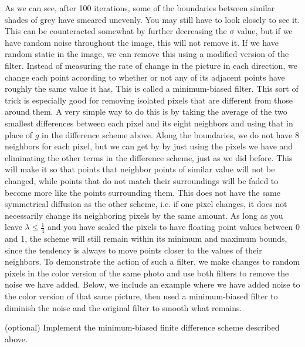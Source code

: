 As we can see, after 100 iterations, some of the boundaries between similar shades of grey have smeared unevenly. You may still have to look closely to see it.
This can be counteracted somewhat by further decreasing the $\sigma$ value, but if we have random noise throughout the image, this will not remove it.
If we have random static in the image, we can remove this using a modified version of the filter.
Instead of measuring the rate of change in the picture in each direction, we change each point according to whether or not any of its adjacent points have roughly the same value it has.
This is called a minimum-biased filter.
This sort of trick is especially good for removing isolated pixels that are different from those around them.
A very simple way to do this is by taking the average of the two smallest differences between each pixel and its eight neighbors and using that in place of $g$ in the difference scheme above.
Along the boundaries, we do not have 8 neighbors for each pixel, but we can get by by just using the pixels we have and eliminating the other terms in the difference scheme, just as we did before.
This will make it so that points that neighbor points of similar value will not be changed, while points that do not match their surroundings will be faded to become more like the points surrounding them.
This does not have the same symmetrical diffusion as the other scheme, i.e. if one pixel changes, it does not necessarily change its neighboring pixels by the same amount.
As long as you leave $\lambda \leq \frac{1}{4}$ and you have scaled the pixels to have floating point values between 0 and 1, the scheme will still remain within its minimum and maximum bounds, since the tendency is always to move points closer to the values of their neighbors.
To demonstrate the action of such a filter, we make changes to random pixels in the color version of the same photo and use both filters to remove the noise we have added.
Below, we include an example where we have added noise to the color version of that same picture, then used a minimum-biased filter to diminish the noise and the original filter to smooth what remains.

\begin{problem}
(optional)
Implement the minimum-biased finite difference scheme described above.
\end{problem}

